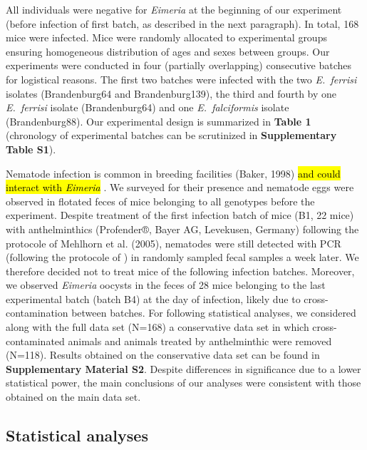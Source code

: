 \documentclass[12pt]{article}
\begin{document}
All individuals were negative for \textit{Eimeria }at the beginning of our experiment (before infection of first batch, as described in the next paragraph). In total, 168 mice were infected. Mice were randomly allocated to experimental groups ensuring homogeneous distribution of ages and sexes between groups. Our experiments were conducted in four (partially overlapping) consecutive batches for logistical reasons. The first two batches were infected with the two \textit{E.~ferrisi }isolates (Brandenburg64 and Brandenburg139), the third and fourth by one \textit{E.~ferrisi }isolate (Brandenburg64) and one \textit{E.~falciformis }isolate (Brandenburg88). Our experimental design is summarized in \textbf{Table 1} (chronology of experimental batches can be scrutinized in \textbf{Supplementary Table S1}). \par

Nematode infection is common in breeding facilities (Baker, 1998) \hl{and could interact with \textit{Eimeria}} \citep{clerc_parasitic_2019}. We surveyed for their presence and nematode eggs were observed in flotated feces of mice belonging to all genotypes before the experiment. Despite treatment of the first infection batch of mice (B1, 22 mice) with anthelminthics (Profender®, Bayer AG, Levekusen, Germany) following the protocole of Mehlhorn et al. (2005), nematodes were still detected with PCR (following the protocole of \cite{floyd_nematode-specific_2005}) in randomly sampled fecal samples a week later. We therefore decided not to treat mice of the following infection batches. Moreover, we observed \textit{Eimeria }oocysts in the feces of 28 mice belonging to the last experimental batch (batch B4) at the day of infection, likely due to cross-contamination between batches. For following statistical analyses, we considered along with the full data set (N=168) a conservative data set in which cross-contaminated animals and animals treated by anthelminthic were removed (N=118). Results obtained on the conservative data set can be found in \textbf{Supplementary Material S2}. Despite differences in significance due to a lower statistical power, the main conclusions of our analyses were consistent with those obtained on the main data set.\par

\subsection{Statistical analyses}
\end{document}

